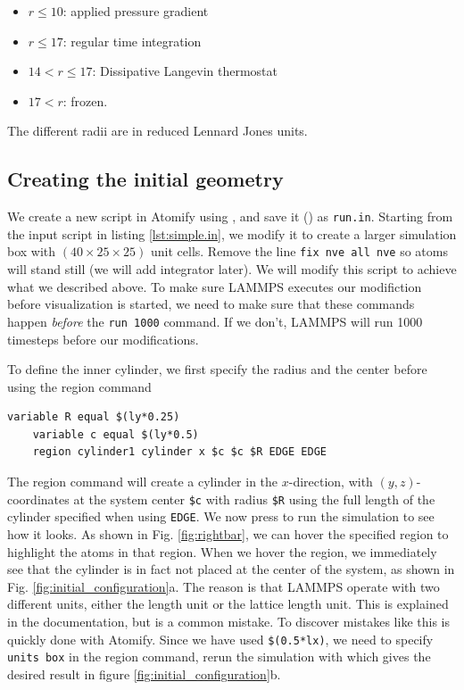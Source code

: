 \documentclass[aps,pre,twocolumn,letterpaper,floatfix,nofootinbib]{revtex4}
\newcommand{\code}[1]{\colorbox{light-gray}{\color{RawSienna}\texttt{#1}}}
\begin{document}
\begin{itemize}
	\item $r \leq 10$: applied pressure gradient
	\item $r \leq 17$: regular time integration
	\item $14 < r \leq 17$: Dissipative Langevin thermostat
	\item $17 < r$: frozen.
\end{itemize}
The different radii are in reduced Lennard Jones units.

\subsection{Creating the initial geometry}
We create a new script in Atomify using , and save it () as \code{run.in}.
Starting from the input script in listing \ref{lst:simple.in}, we modify it to create a larger simulation box with $(40\times25\times25)$ unit cells.
Remove the line \code{fix nve all nve} so atoms will stand still (we will add integrator later).
We will modify this script to achieve what we described above. To make sure LAMMPS executes our modifiction before visualization is started, we need to make sure that these commands happen \textit{before} the \code{run 1000} command.
If we don't, LAMMPS will run 1000 timesteps before our modifications.

To define the inner cylinder, we first specify the radius and the center before using the region command
\begin{lstlisting}[basicstyle=\tiny, frame = none, numbers=none, framexleftmargin=0pt, xleftmargin=-0.75cm, xrightmargin=0.0cm]
	variable R equal $(ly*0.25)
	variable c equal $(ly*0.5)
	region cylinder1 cylinder x $c $c $R EDGE EDGE
\end{lstlisting}
The region command will create a cylinder in the $x$-direction, with $(y,z)$-coordinates at the system center \code{\$c} with radius \code{\$R} using the full length of the cylinder specified when using \code{EDGE}.
We now press  to run the simulation to see how it looks.
As shown in Fig. \ref{fig:rightbar}, we can hover the specified region to highlight the atoms in that region.
When we hover the region, we immediately see that the cylinder is in fact not placed at the center of the system, as shown in Fig. \ref{fig:initial_configuration}a.
The reason is that LAMMPS operate with two different units, either the length unit or the lattice length unit. This is explained in the documentation, but is a common mistake.
To discover mistakes like this is quickly done with Atomify.
Since we have used \code{\$(0.5*lx)}, we need to specify \code{units box} in the region command, rerun the simulation with  which gives the desired result in figure  \ref{fig:initial_configuration}b.
\end{document}
